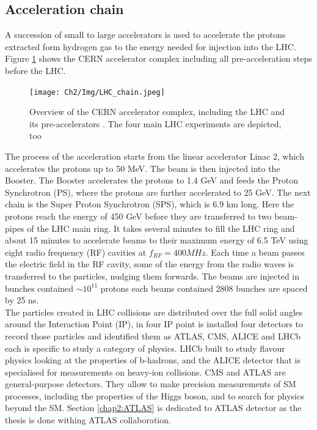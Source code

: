 \subsection{Acceleration chain}
\label{chap2:LHC:chain}
A succession of small to large accelerators is used to accelerate the protons extracted form hydrogen gas to the energy needed for injection into the LHC. Figure \ref{fig:chap2:LHC:chain} shows the CERN accelerator complex including all pre-acceleration steps before the LHC.
\begin{figure}[htbp]
    \centering
    \texttt{[image: Ch2/Img/LHC\_chain.jpeg]}
    \caption{Overview of the CERN accelerator complex, including the LHC and its pre-accelerators \cite{LHC_chain}. The four main LHC experiments are depicted, too}
    \label{fig:chap2:LHC:chain}
\end{figure}
The process of the acceleration starts from the linear accelerator Linac 2, which accelerates the protons up to 50 MeV. The beam is then injected into the Booster. The Booster accelerates the protons to 1.4 GeV and feeds the Proton Synchrotron (PS), where the protons are further accelerated to 25 GeV. The next chain is the Super Proton Synchrotron (SPS), which is 6.9 km long. Here the protons reach the energy of 450 GeV before they are transferred to two beam-pipes of the LHC main ring. It takes several minutes to fill the LHC ring and about 15 minutes to accelerate beams to their maximum energy of 6.5 TeV using eight radio frequency (RF) cavities at $f_{RF} = 400 MHz$. Each time a beam passes the electric field in the RF cavity, some of the energy from the radio waves is transferred to the particles, nudging them forwards. The beams are injected in bunches contained $\sim 10^{11}$ protons each beams contained 2808 bunches are spaced by 25 ns. \\
The particles created in LHC collisions are distributed over the full solid angles around the Interaction Point (IP), in four IP point is installed four detectors to record those particles and identified them as ATLAS, CMS, ALICE and LHCb each is specific to study a category of physics. LHCb built to study flavour physics looking at the properties of b-hadrons, and the ALICE detector that is specialised for measurements on heavy-ion collisions. CMS and ATLAS are general-purpose detectors. They allow to make precision measurements of SM processes, including the properties of the Higgs boson, and to search for physics beyond the SM. Section \ref{chap2:ATLAS} is dedicated to ATLAS detector as the thesis is done withing ATLAS collaboration.

